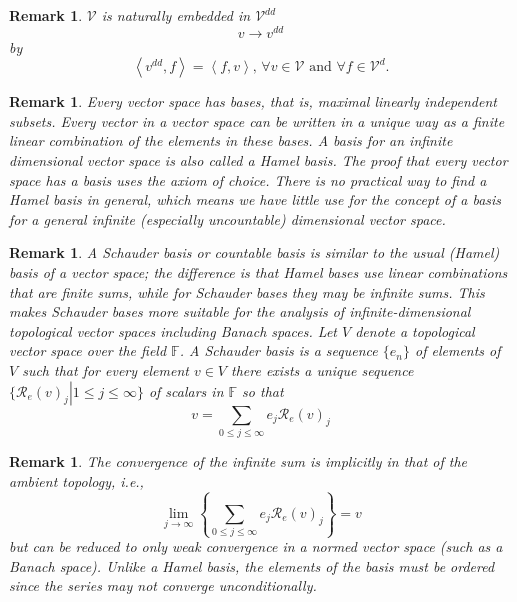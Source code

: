 \documentclass[aps,preprint]{revtex4}%
\newtheorem{remark}[theorem]{Remark}
\begin{document}
\begin{remark}
$\mathcal{V}$ is naturally embedded in $\mathcal{V}^{dd}$
\begin{equation}
v\rightarrow v^{dd}%
\end{equation}
by%
\begin{equation}
\left\langle v^{dd},f\right\rangle =\left\langle f,v\right\rangle ,\,\forall
v\in\mathcal{V}\text{ and }\forall f\in\mathcal{V}^{d}.
\end{equation}

\end{remark}

\begin{remark}
Every vector space has bases, that is, maximal linearly independent subsets.
Every vector in a vector space can be written in a unique way as a finite
linear combination of the elements in these bases. A basis for an infinite
dimensional vector space is also called a \emph{Hamel} basis. The proof that
every vector space has a basis uses the axiom of choice. There is no practical
way to find a Hamel basis in general, which means we have little use for the
concept of a basis for a general infinite (especially uncountable) dimensional
vector space.
\end{remark}

\begin{remark}
A \emph{Schauder} basis or countable basis is similar to the usual (Hamel)
basis of a vector space; the difference is that Hamel bases use linear
combinations that are finite sums, while for Schauder bases they may be
infinite sums. This makes Schauder bases more suitable for the analysis of
infinite-dimensional topological vector spaces including Banach spaces. Let
$V$ denote a topological vector space over the field $\mathbb{F}$. A Schauder
basis is a sequence $\{e_{n}\}$ of elements of $V$ such that for every element
$v\in V$ there exists a unique sequence $\{\left.  \mathcal{R}_{e}\left(
v\right)  _{j}\right\vert 1\leq j\leq\infty\}$ of scalars in $\mathbb{F}$ so
that%
\begin{equation}
v=\sum_{0\leq j\leq\infty}e_{j}\mathcal{R}_{e}\left(  v\right)  _{j}%
\end{equation}

\end{remark}

\begin{remark}
The convergence of the infinite sum is implicitly in that of the ambient
topology, i.e.,%
\begin{equation}
\lim_{j\rightarrow\infty}\left\{  \sum_{0\leq j\leq\infty}e_{j}\mathcal{R}%
_{e}\left(  v\right)  _{j}\right\}  =v
\end{equation}
but can be reduced to only weak convergence in a normed vector space (such as
a Banach space). Unlike a Hamel basis, the elements of the basis must be
ordered since the series may not converge unconditionally.
\end{remark}
\end{document}
